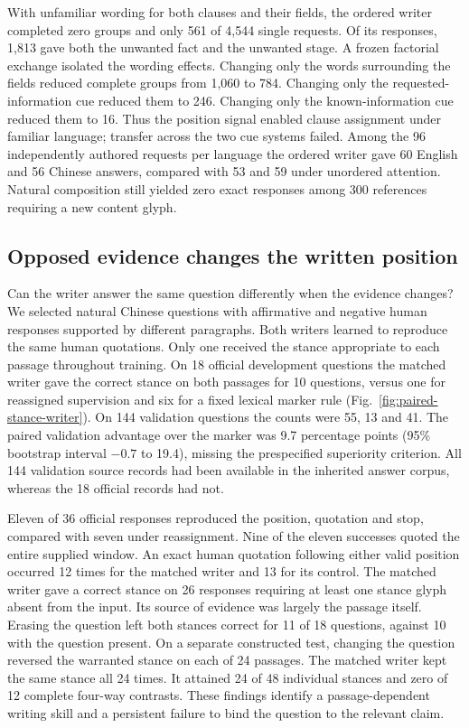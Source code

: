 \documentclass[12pt,a4paper]{article}
\providecommand{\DIFadd}[1]{{\protect\color{blue} \sf #1}} %
\begin{document}
\DIFadd{With unfamiliar wording for both clauses and their fields, the ordered writer completed zero groups and only 561 of 4,544 single requests. Of its responses, 1,813 gave both the unwanted fact and the unwanted stage. A frozen factorial exchange isolated the wording effects. Changing only the words surrounding the fields reduced complete groups from 1,060 to 784. Changing only the requested-information cue reduced them to 246. Changing only the known-information cue reduced them to 16. Thus the position signal enabled clause assignment under familiar language; transfer across the two cue systems failed. Among the 96 independently authored requests per language the ordered writer gave 60 English and 56 Chinese answers, compared with 53 and 59 under unordered attention. Natural composition still yielded zero exact responses among 300 references requiring a new content glyph.
}

\subsection*{\DIFadd{Opposed evidence changes the written position}}
\DIFadd{Can the writer answer the same question differently when the evidence changes? We selected natural Chinese questions with affirmative and negative human responses supported by different paragraphs. Both writers learned to reproduce the same human quotations. Only one received the stance appropriate to each passage throughout training. On 18 official development questions the matched writer gave the correct stance on both passages for 10 questions, versus one for reassigned supervision and six for a fixed lexical marker rule (Fig.~\ref{fig:paired-stance-writer}). On 144 validation questions the counts were 55, 13 and 41. The paired validation advantage over the marker was 9.7 percentage points (95\% bootstrap interval $-0.7$ to 19.4), missing the prespecified superiority criterion. All 144 validation source records had been available in the inherited answer corpus, whereas the 18 official records had not.
}

\DIFadd{Eleven of 36 official responses reproduced the position, quotation and stop, compared with seven under reassignment. Nine of the eleven successes quoted the entire supplied window. An exact human quotation following either valid position occurred 12 times for the matched writer and 13 for its control. The matched writer gave a correct stance on 26 responses requiring at least one stance glyph absent from the input. Its source of evidence was largely the passage itself. Erasing the question left both stances correct for 11 of 18 questions, against 10 with the question present. On a separate constructed test, changing the question reversed the warranted stance on each of 24 passages. The matched writer kept the same stance all 24 times. It attained 24 of 48 individual stances and zero of 12 complete four-way contrasts. These findings identify a passage-dependent writing skill and a persistent failure to bind the question to the relevant claim.
}
\end{document}
